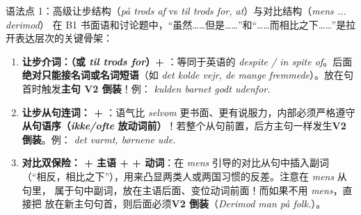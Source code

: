 
\begin{grammatikbox}{语法点 1：高级让步结构（\textit{på trods af} vs \textit{til trods for, at}）与对比结构（\textit{mens ... derimod}）}
在 B1 书面语和讨论题中，“虽然……但是……”和“……而相比之下……”是拉开表达层次的关键骨架：
\begin{enumerate}
  \item \textbf{让步介词：（或 \textit{til trods for}）+ }：等同于英语的 \textit{despite / in spite of}。后面\textbf{绝对只能接名词或名词短语}（如 \textit{det kolde vejr, de mange fremmede}）。放在句首时触发\textbf{主句 V2 倒装}！例：\textit{ kulden  barnet godt udenfor.}
  \item \textbf{让步从句连词： + }：语气比 \textit{selvom} 更书面、更有说服力，内部必须严格遵守\textbf{从句语序（\textit{ikke/ofte} 放动词前）}！若整个从句前置，后方主句一样发生\textbf{V2 倒装}。例：\textit{ det  varmt,  børnene ude.}
  \item \textbf{对比双保险： + 主语 +  + 动词}：在 \textit{mens} 引导的对比从句中插入副词 （“相反，相比之下”），用来凸显两类人或两国习惯的反差。注意在 \textit{mens} 从句里， 属于句中副词，放在主语后面、变位动词前面！而如果不用 \textit{mens}，直接把  放在新主句句首，则后面必须\textbf{V2 倒装}（\textit{Derimod  man på folk.}）。
\end{enumerate}
\end{grammatikbox}

